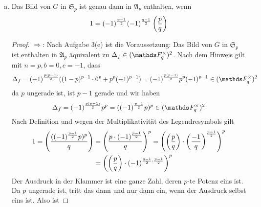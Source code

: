 \begin{enumerate}[(a)]
\begin{proof}
\[        \]
        Das liefert uns die Multiplikativität des Legendresymbols. Ferner gilt wieder nach Blatt 6 Aufgabe 3 (c), dass
        \[
        (-1)^{\frac{q-1}{2}} = \begin{cases}
            1, & \text{falls } -1\in (\F_q^\times)^2 \\ 
            -1, & \text{falls } -1 \notin (\F_q^\times)^2
        \end{cases}     
        \]
        was nach Definition mit $\left(\frac{-1}{q}\right)$ übereinstimmt. Ist $q\equiv 1 \mod 4$, dann gibt es ein $k\in \Z$ mit $q = 4k+1$ und es gilt 
        \[
        (-1)^{\frac{q-1}{2}} = (-1)^\frac{4k+1-1}{2} = 1    
        \]
        und analog, falls $q\equiv 3 \mod 4$ existiert ein $l\in \Z$ mit $q=4k+3$ und es folgt
        \[
        (-1)^{\frac{q-1}{2}} = (-1)^\frac{4l+3-1}{2} = (-1)^\frac{2(2l+1)}{2} = -1 
        \]
        was zu zeigen war. 
    \end{proof}
    Sei nun $L$ der Zerfällungskörper von $f=X^p-1$ über $\F_q$ und $G=\gal(L/\F_q)$ und wir betten die Galoisgruppe $G$ 
    wie immer (d.h. durch Wirkung auf den Nullstellen von $f$) via $G\hookrightarrow \mathfrak{S}_p$ ein.
    \item Das Bild von $G$ in $\mathfrak{S}_p$ ist genau dann in $\mathfrak{A}_p$ enthalten, wenn 
    \[
    1 = (-1)^{\frac{p-1}{2}}(-1)^\frac{q-1}{2}\left(\frac{p}{q}\right)
    \] 
    \begin{proof}
        \glqq$\Rightarrow$\grqq: Nach Aufgabe 3(e) ist die Voraussetzung: Das Bild von $G$ in $\mathfrak{S}_p$ ist enthalten in $\mathfrak{A}_p$ äquivalent zu $\Delta_f\in (\F_q^\times)^2$. Nach dem Hinweis gilt mit $n=p, b=0, c=-1$, dass 
        \[
        \Delta_f = (-1)^\frac{p(p-1)}{2}((1-p)^{p-1}\cdot 0^p+p^p(-1)^{p-1}) =  (-1)^\frac{p(p-1)}{2}p^p(-1)^{p-1}\in (\F_q^\times)^2   
        \]
        da $p$ ungerade ist, ist $p-1$ gerade und wir haben 
        \[
        \Delta_f = (-1)^\frac{p(p-1)}{2}p^p = ((-1)^\frac{p-1}{2}p)^p\in (\F_q^\times)^2    
        \]
        Nach Definition und wegen der Multiplikativität des Legendresymbols gilt 
        \begin{align*}
            1 = \left(\frac{((-1)^\frac{p-1}{2}p)^p}{q}\right) &= \left(\frac{p\cdot (-1)^\frac{p-1}{2}}{q}\right)^p = \left(\left(\frac{p}{q}\right)\cdot \left(\frac{-1}{q}\right)^\frac{p-1}{2}\right)^p \\
            &= \left( \left(\frac{p}{q}\right) \cdot (-1)^{\frac{q-1}{2}\cdot\frac{p-1}{2}} \right)^p
        \end{align*}
        Der Ausdruck in der Klammer ist eine ganze Zahl, deren $p$-te Potenz eins ist. Da $p$ ungerade ist, tritt das dann und nur dann ein, wenn der Ausdruck selbst eins ist. Also ist 

\end{proof}
\end{enumerate}

